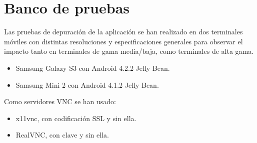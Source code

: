 \newpage
\section{Banco de pruebas}
Las pruebas de depuración de la aplicación se han realizado en dos terminales móviles con distintas resoluciones y especificaciones generales para observar el impacto tanto en terminales de gama media/baja, como terminales de alta gama.
\begin{itemize}
\item Samsung Galazy S3 con Android 4.2.2 Jelly Bean.
\item Samsung Mini 2 con Android 4.1.2 Jelly Bean.
\end{itemize}

Como servidores VNC se han usado:
\begin{itemize}
\item x11vnc, con codificación SSL y sin ella.
\item RealVNC, con clave y sin ella.
\end{itemize}
